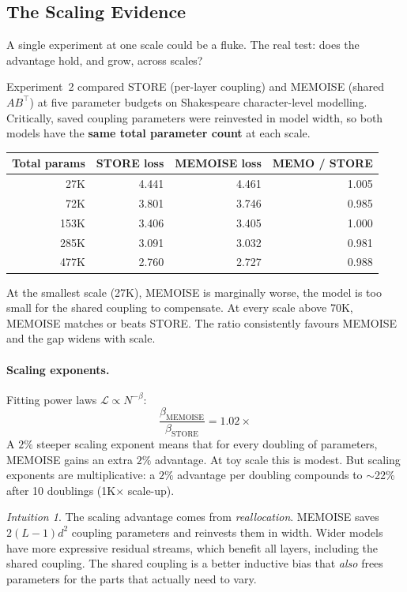 \documentclass[11pt, a4paper]{article}
\newcommand{\calL}{\mathcal{L}}
\theoremstyle{remark}
\newtheorem*{intuition}{Intuition}
\begin{document}
\subsection{The Scaling Evidence}
\label{sec:grn:scaling}

A single experiment at one scale could be a fluke.
The real test: does the advantage hold, and grow, across scales?

Experiment~2 compared STORE (per-layer coupling) and MEMOISE (shared $AB^\top$) at five parameter budgets on Shakespeare character-level modelling.
Critically, saved coupling parameters were reinvested in model width, so both models have the \textbf{same total parameter count} at each scale.

\begin{center}\small
\renewcommand{\arraystretch}{1.2}
\begin{tabular}{@{}rrrr@{}}
\toprule
\textbf{Total params} & \textbf{STORE loss} & \textbf{MEMOISE loss} & \textbf{MEMO / STORE} \\
\midrule
27K & 4.441 & 4.461 & 1.005 \\
72K & 3.801 & 3.746 & 0.985 \\
153K & 3.406 & 3.405 & 1.000 \\
285K & 3.091 & 3.032 & 0.981 \\
477K & 2.760 & 2.727 & 0.988 \\
\bottomrule
\end{tabular}
\end{center}

At the smallest scale (27K), MEMOISE is marginally worse, the model is too small for the shared coupling to compensate.
At every scale above 70K, MEMOISE matches or beats STORE.
The ratio consistently favours MEMOISE and the gap widens with scale.

\paragraph{Scaling exponents.}
Fitting power laws $\calL \propto N^{-\beta}$:
\[
\frac{\beta_{\text{MEMOISE}}}{\beta_{\text{STORE}}} = 1.02\times
\]
A $2\%$ steeper scaling exponent means that for every doubling of parameters, MEMOISE gains an extra $2\%$ advantage.
At toy scale this is modest.
But scaling exponents are multiplicative: a $2\%$ advantage per doubling compounds to $\sim$22\% after 10 doublings (1K$\times$ scale-up).

\begin{intuition}
The scaling advantage comes from \emph{reallocation}.
MEMOISE saves $2(L-1)d^2$ coupling parameters and reinvests them in width.
Wider models have more expressive residual streams, which benefit all layers, including the shared coupling.
The shared coupling is a better inductive bias that \emph{also} frees parameters for the parts that actually need to vary.
\end{intuition}
\end{document}
